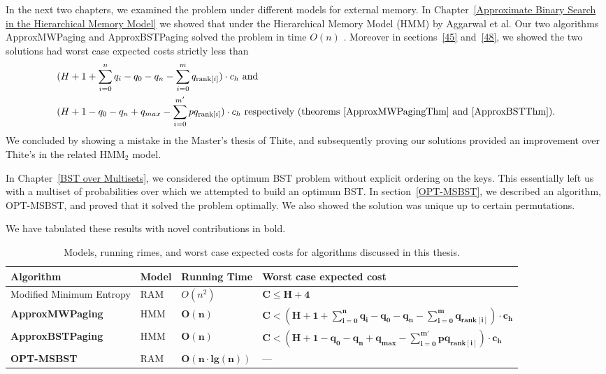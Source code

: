\documentclass[letterpaper,12pt,titlepage,oneside,final]{book}
\theoremstyle{plain}
\begin{document}
 In the next two chapters, we examined the problem under different models for external memory. In Chapter~\ref{Approximate Binary Search in the Hierarchical Memory Model} we showed that under the Hierarchical Memory Model (HMM) by Aggarwal et al. Our two algorithms ApproxMWPaging and ApproxBSTPaging solved the problem in time $O(n)$ \cite{aggarwal1987model}. Moreover in sections~\ref{45} and~\ref{48}, we showed the two solutions had worst case expected costs strictly less than
\begin{align*}
&(H + 1 + \sum_{i=0}^n q_i - q_0 - q_n - \sum_{i=0}^m q_{\text{rank}[i]}) \cdot  c_h \text{ and} \\
&(H + 1 - q_0 - q_n + q_{max} - \sum_{i=0}^{m'} pq_{\text{rank}[i]})\cdot c_h \text{ respectively  (theorems~\ref{ApproxMWPagingThm} and~\ref{ApproxBSTThm})}.
\end{align*}
   We concluded by showing a mistake in the Master's thesis of Thite, and subsequently proving our solutions provided an improvement over Thite's in the related HMM$_2$ model.

In Chapter~\ref{BST over Multisets}, we considered the optimum BST problem without explicit ordering on the keys. This essentially left us with a multiset of probabilities over which we attempted to build an optimum BST. In section~\ref{OPT-MSBST}, we described an algorithm, OPT-MSBST, and proved that it solved the problem optimally. We also showed the solution was unique up to certain permutations.

We have tabulated these results with novel contributions in bold.

\begin{table}[!hb]


\begin{center}
    \begin{tabular}{ | l | l | l | p{7.1cm} |}
    \hline
    Algorithm & Model & Running Time & Worst case expected cost \\ \hline
    \scriptsize Modified Minimum Entropy & \scriptsize RAM  & \scriptsize $O(n^2)$    & \scriptsize $\mathbf{C \leq H+4}$    \\ \hline
   \scriptsize \textbf{ApproxMWPaging}  & \scriptsize HMM  & \scriptsize $\mathbf{O(n)}$   & \scriptsize $\mathbf{C < (H + 1 + \sum_{i=0}^n q_i - q_0 - q_n - \sum_{i=0}^m q_{\text{rank}[i]}) \cdot  c_h}$    \\ \hline
    \scriptsize \textbf{ApproxBSTPaging}  & \scriptsize HMM & \scriptsize $\mathbf{O(n)}$    &  \scriptsize $\mathbf{C < (H + 1 - q_0 - q_n + q_{max} - \sum_{i=0}^{m'} pq_{\text{rank}[i]})\cdot c_h}$    \\ \hline
    \scriptsize \textbf{OPT-MSBST}  & \scriptsize RAM  & \scriptsize $\mathbf{O(n\cdot lg(n))}$    & \scriptsize ---    \\ \hline
    \end{tabular}
\end{center}

\caption{Models, running rimes, and worst case expected costs for algorithms discussed in this thesis.}
\end{table}
 
\end{document}
